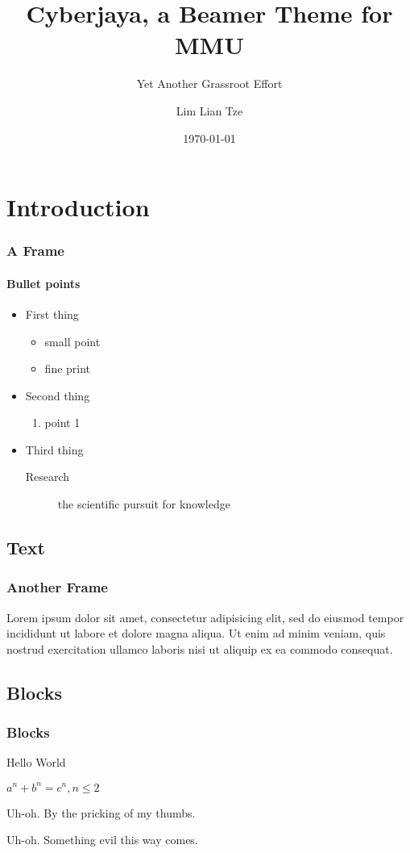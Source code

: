 \documentclass[compress]{beamer}
\title{Cyberjaya, a Beamer Theme for MMU}
\subtitle{Yet Another Grassroot Effort}
\author{Lim Lian Tze}
\date{\today}
\institute{\url{liantze@gmail.com}\\\url{http://liantze.penguinattack.org/}}
\begin{document}
\begin{frame}[plain,t]
\titlepage
\end{frame}


\section{Introduction}
\begin{frame}
\frametitle{A Frame}
\framesubtitle{Bullet points}
\begin{itemize}
\item First thing
	\begin{itemize}
	\item small point
	\item fine print
	\end{itemize}
\item Second thing
	\begin{enumerate}
	\item point 1
	\end{enumerate}
\item Third thing
	\begin{description}
	\item[Research] the scientific pursuit for knowledge
	\end{description}
\end{itemize}
\end{frame}

\subsection{Text}
\begin{frame}
\frametitle{Another Frame}
Lorem ipsum dolor sit amet, consectetur adipisicing elit, sed do eiusmod tempor incididunt ut labore et dolore magna aliqua. Ut enim ad minim veniam, quis nostrud exercitation ullamco laboris nisi ut aliquip ex ea commodo consequat.
\end{frame}

\subsection{Blocks}
\begin{frame}
\frametitle{Blocks}
\begin{definition}[Greetings]
Hello World
\end{definition}

\begin{theorem}
$a^n + b^n = c^n, n \leq 2$
\end{theorem}

\begin{alertblock}{Uh-oh.}
By the pricking of my thumbs.
\end{alertblock}

\begin{exampleblock}{Uh-oh.}
Something evil this way comes.
\end{exampleblock}

\end{frame}

\end{document}

